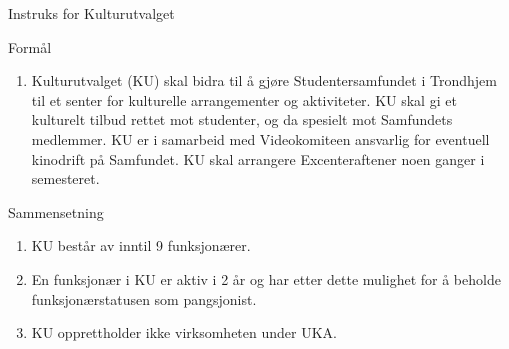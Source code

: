 
\begin{instruks}{Instruks for Kulturutvalget}{ }{ }

    \begin{instruksledd}{Formål}
        \begin{enumerate}
            \item Kulturutvalget (KU) skal bidra til å gjøre Studentersamfundet i Trondhjem til et
senter for kulturelle
arrangementer og aktiviteter. KU skal gi et kulturelt tilbud rettet mot studenter, og da spesielt
mot
Samfundets medlemmer. KU er i samarbeid med Videokomiteen ansvarlig for eventuell kinodrift på
Samfundet. KU skal arrangere Excenteraftener noen ganger i semesteret.
                    \end{enumerate}
    \end{instruksledd}

    \begin{instruksledd}{Sammensetning}
        \begin{enumerate}
            \item KU består av inntil 9 funksjonærer. 
            \item En funksjonær i KU er aktiv i 2 år og har etter dette mulighet for å beholde
funksjonærstatusen som
pangsjonist.
            \item KU opprettholder ikke virksomheten under UKA.
        \end{enumerate}
    \end{instruksledd}
    

\end{instruks}



